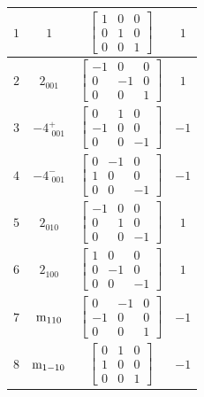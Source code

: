\documentclass[fleqn,8pt]{jsarticle}
\begin{document}
\begin{longtable}{cccc}
$ 1 $ & $ 1 $ & $ \begin{bmatrix} 1 & 0 & 0 \\ 0 & 1 & 0 \\ 0 & 0 & 1 \end{bmatrix} $ & $ 1 $ \\ \hline
$ 2 $ & $ 2{}_{001} $ & $ \begin{bmatrix} -1 & 0 & 0 \\ 0 & -1 & 0 \\ 0 & 0 & 1 \end{bmatrix} $ & $ 1 $ \\ \hline
$ 3 $ & $ -4^{+}_{\,\,001} $ & $ \begin{bmatrix} 0 & 1 & 0 \\ -1 & 0 & 0 \\ 0 & 0 & -1 \end{bmatrix} $ & $ -1 $ \\ \hline
$ 4 $ & $ -4^{-}_{\,\,001} $ & $ \begin{bmatrix} 0 & -1 & 0 \\ 1 & 0 & 0 \\ 0 & 0 & -1 \end{bmatrix} $ & $ -1 $ \\ \hline
$ 5 $ & $ 2{}_{010} $ & $ \begin{bmatrix} -1 & 0 & 0 \\ 0 & 1 & 0 \\ 0 & 0 & -1 \end{bmatrix} $ & $ 1 $ \\ \hline
$ 6 $ & $ 2{}_{100} $ & $ \begin{bmatrix} 1 & 0 & 0 \\ 0 & -1 & 0 \\ 0 & 0 & -1 \end{bmatrix} $ & $ 1 $ \\ \hline
$ 7 $ & $ {\rm m}_{110} $ & $ \begin{bmatrix} 0 & -1 & 0 \\ -1 & 0 & 0 \\ 0 & 0 & 1 \end{bmatrix} $ & $ -1 $ \\ \hline
$ 8 $ & $ {\rm m}_{1-10} $ & $ \begin{bmatrix} 0 & 1 & 0 \\ 1 & 0 & 0 \\ 0 & 0 & 1 \end{bmatrix} $ & $ -1 $ \\
\end{longtable}
\end{document}
